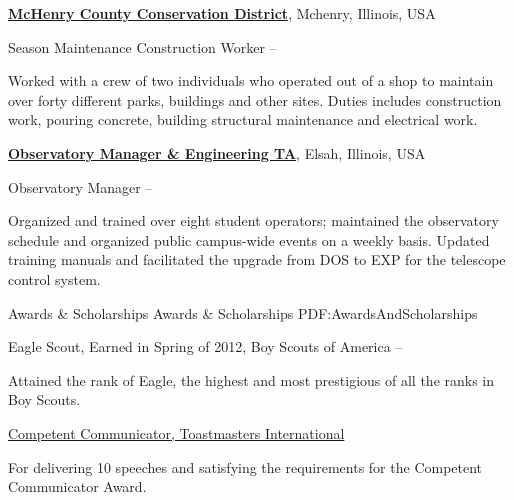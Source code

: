 \documentclass[a4paper,MMMyyyy,nonstopmode]{simpleresumecv}
\begin{document}
\begin{Body}

\href{http://www.mccdistrict.org/rccms/}
{\textbf{
McHenry County Conservation District}},
Mchenry, Illinois, USA

\Gap
\BulletItem
Season Maintenance Construction Worker
\hfill
{} --
\begin{Detail}
\SubBulletItem
Worked with a crew of two individuals who operated out of a shop to maintain over forty different parks, buildings and other sites. Duties includes construction work, pouring concrete, building structural maintenance and electrical work.
\end{Detail}


\href{http://www.mccdistrict.org/rccms/}
{\textbf{Observatory Manager \& Engineering TA}},
Elsah, Illinois, USA

\Gap
\BulletItem
Observatory Manager
\hfill
{} --
\begin{Detail}
\SubBulletItem
Organized and trained over eight student operators; maintained the observatory schedule and organized public campus-wide events on a weekly basis.
\SubBulletItem
Updated training manuals and facilitated the upgrade from DOS to EXP for the telescope control system.
\end{Detail}


\Section
{Awards \&\newline
Scholarships}
{Awards \& Scholarships}
{PDF:AwardsAndScholarships}

\BulletItem
Eagle Scout,
Earned in Spring of 2012,
Boy Scouts of America
\hfill
{} --
\begin{Detail}
\Item
Attained the rank of Eagle, the highest and most prestigious of all the ranks in Boy Scouts.
\end{Detail}

\Gap
\BulletItem
\href{https://www.toastmasters.org/Education/Communication-Track}{Competent Communicator,
Toastmasters International}
\hfill
{}
\begin{Detail}
\Item
For delivering 10 speeches and satisfying the requirements for the Competent Communicator Award. 
\end{Detail}



\end{Body}
\end{document}
